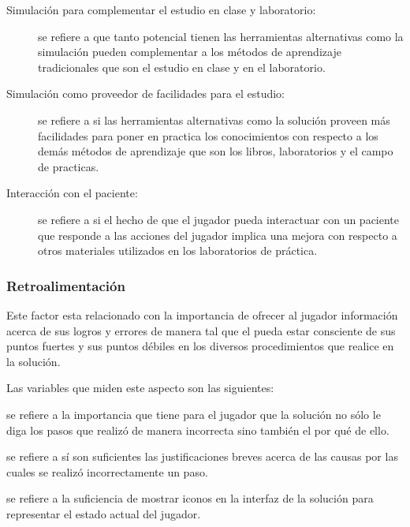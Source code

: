 \begin{description}
\item[Simulación para complementar el estudio en clase y laboratorio:] se
    refiere a que tanto potencial tienen las herramientas alternativas como la
    simulación pueden complementar a los métodos de aprendizaje tradicionales
    que son el estudio en clase y en el laboratorio.

\item[Simulación como proveedor de facilidades para el estudio:] se refiere a si las
    herramientas alternativas como la solución proveen más facilidades para
    poner en practica los conocimientos con respecto a los demás métodos de
    aprendizaje que son los libros, laboratorios y el campo de practicas.

\item[Interacción con el paciente:] se refiere a si el hecho de que el jugador
    pueda interactuar con un paciente que responde a las acciones del jugador 
    implica una mejora con respecto a otros materiales utilizados en los 
    laboratorios de práctica.

\end{description}


\subsubsection{Retroalimentación}
\label{sec:sub_retroalimentacion}

Este factor esta relacionado con la importancia de ofrecer al jugador
información acerca de sus logros y errores de manera tal que el pueda estar
consciente de sus puntos fuertes y sus puntos débiles en los diversos
procedimientos que realice en la solución.

Las variables que miden este aspecto son las siguientes:

\begin{description}[style=unboxed]

\item[Detalles de los pasos realizados incorrectamente:] se refiere a 
    la importancia que tiene para el jugador que la solución no sólo le 
    diga los pasos que realizó de manera incorrecta sino también el por qué 
    de ello.

\item[Retroalimentación suficiente respecto a los pasos realizados:] se refiere 
    a sí son suficientes las justificaciones breves acerca de las causas por las 
    cuales se realizó incorrectamente un paso.

\item[Representación iconográfica de conceptos y acciones en la \Gls{gui}:] 
    se refiere a la suficiencia de mostrar iconos en la interfaz de 
    la solución para representar el estado actual del jugador.

\end{description}

